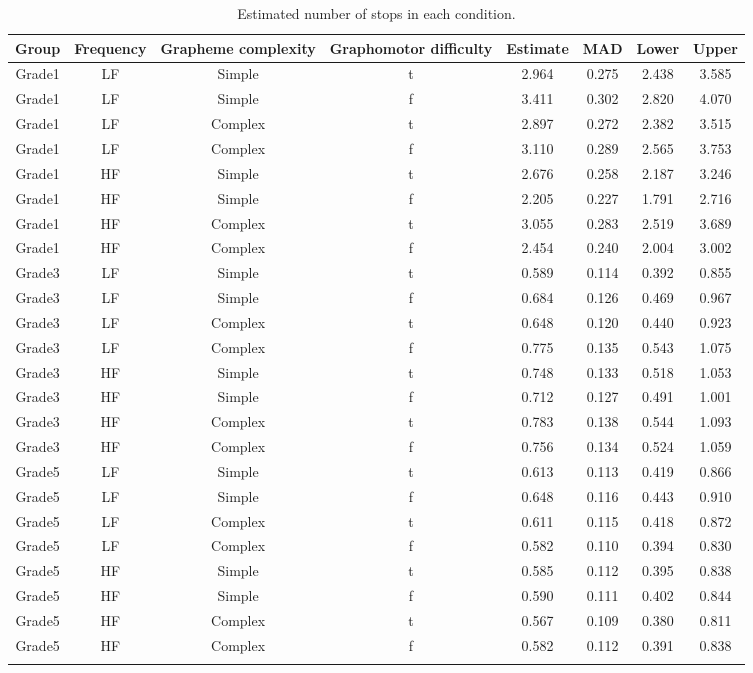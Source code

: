 \documentclass[
  11pt,
  english,
  ,doc,floatsintext]{apa6}
\begin{document}
\begin{table}[htb]

\begin{center}
\begin{threeparttable}

\caption{\label{tab:stops-predictions-summary}Estimated number of stops in each condition.}

\scriptsize{

\begin{tabular}{cccccccc}
\toprule
Group & \multicolumn{1}{c}{Frequency} & \multicolumn{1}{c}{Grapheme complexity} & \multicolumn{1}{c}{Graphomotor difficulty} & \multicolumn{1}{c}{Estimate} & \multicolumn{1}{c}{MAD} & \multicolumn{1}{c}{Lower} & \multicolumn{1}{c}{Upper}\\
\midrule
Grade1 & LF & Simple & t & 2.964 & 0.275 & 2.438 & 3.585\\
Grade1 & LF & Simple & f & 3.411 & 0.302 & 2.820 & 4.070\\
Grade1 & LF & Complex & t & 2.897 & 0.272 & 2.382 & 3.515\\
Grade1 & LF & Complex & f & 3.110 & 0.289 & 2.565 & 3.753\\
Grade1 & HF & Simple & t & 2.676 & 0.258 & 2.187 & 3.246\\
Grade1 & HF & Simple & f & 2.205 & 0.227 & 1.791 & 2.716\\
Grade1 & HF & Complex & t & 3.055 & 0.283 & 2.519 & 3.689\\
Grade1 & HF & Complex & f & 2.454 & 0.240 & 2.004 & 3.002\\
Grade3 & LF & Simple & t & 0.589 & 0.114 & 0.392 & 0.855\\
Grade3 & LF & Simple & f & 0.684 & 0.126 & 0.469 & 0.967\\
Grade3 & LF & Complex & t & 0.648 & 0.120 & 0.440 & 0.923\\
Grade3 & LF & Complex & f & 0.775 & 0.135 & 0.543 & 1.075\\
Grade3 & HF & Simple & t & 0.748 & 0.133 & 0.518 & 1.053\\
Grade3 & HF & Simple & f & 0.712 & 0.127 & 0.491 & 1.001\\
Grade3 & HF & Complex & t & 0.783 & 0.138 & 0.544 & 1.093\\
Grade3 & HF & Complex & f & 0.756 & 0.134 & 0.524 & 1.059\\
Grade5 & LF & Simple & t & 0.613 & 0.113 & 0.419 & 0.866\\
Grade5 & LF & Simple & f & 0.648 & 0.116 & 0.443 & 0.910\\
Grade5 & LF & Complex & t & 0.611 & 0.115 & 0.418 & 0.872\\
Grade5 & LF & Complex & f & 0.582 & 0.110 & 0.394 & 0.830\\
Grade5 & HF & Simple & t & 0.585 & 0.112 & 0.395 & 0.838\\
Grade5 & HF & Simple & f & 0.590 & 0.111 & 0.402 & 0.844\\
Grade5 & HF & Complex & t & 0.567 & 0.109 & 0.380 & 0.811\\
Grade5 & HF & Complex & f & 0.582 & 0.112 & 0.391 & 0.838\\
\bottomrule
\addlinespace
\end{tabular}

}
\end{threeparttable}
\end{center}
\end{table}
\end{document}
